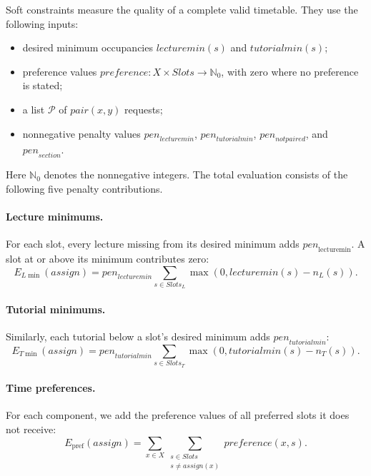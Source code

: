 Soft constraints measure the quality of a complete valid
timetable. They use the following inputs:
\begin{itemize}
  \item desired minimum occupancies
  $\mathit{lecturemin}(s)$ and $\mathit{tutorialmin}(s)$;
  \item preference values
  $\mathit{preference}:X\times\mathit{Slots}\to\mathbb{N}_0$,
  with zero where no preference is stated;
  \item a list $\mathcal P$ of $\mathit{pair}(x,y)$ requests;
  \item nonnegative penalty values
  $\mathit{pen}_{\mathit{lecturemin}}$,
  $\mathit{pen}_{\mathit{tutorialmin}}$,
  $\mathit{pen}_{\mathit{notpaired}}$, and
  $\mathit{pen}_{\mathit{section}}$.
\end{itemize}
Here $\mathbb{N}_0$ denotes the nonnegative integers.
The total evaluation consists of the following five
penalty contributions.

\paragraph{Lecture minimums.}
For each slot, every lecture missing from its desired minimum
adds $\mathit{pen}_{\mathrm{lecturemin}}$. A slot at or above
its minimum contributes zero:
\begin{equation}
E_{L\min}(\mathit{assign})
=\mathit{pen}_{\mathit{lecturemin}}
 \sum_{s\in\mathit{Slots}_L}
 \max(0,\mathit{lecturemin}(s)-n_L(s)).
\label{eq:elmin}
\end{equation}

\paragraph{Tutorial minimums.}
Similarly, each tutorial below a slot's desired minimum
adds $\mathit{pen}_{\mathit{tutorialmin}}$:
\begin{equation}
E_{T\min}(\mathit{assign})
=\mathit{pen}_{\mathit{tutorialmin}}
 \sum_{s\in\mathit{Slots}_T}
 \max(0,\mathit{tutorialmin}(s)-n_T(s)).
\label{eq:etmin}
\end{equation}

\paragraph{Time preferences.}
For each component, we add the preference values of all
preferred slots it does not receive:
\begin{equation}
E_{\mathrm{pref}}(\mathit{assign})
=\sum_{x\in X}
 \sum_{\substack{s\in\mathit{Slots}\\
                 s\neq\mathit{assign}(x)}}
 \mathit{preference}(x,s).
\label{eq:epref}
\end{equation}

